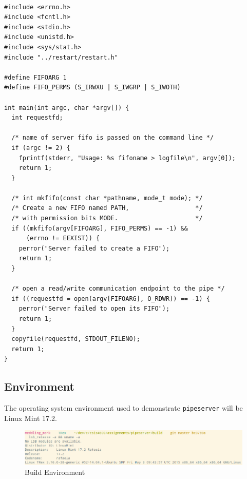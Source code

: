 \documentclass[letter,12pt,sffamily]{article}
\begin{document}
\begin{verbatim}

#include <errno.h>
#include <fcntl.h>
#include <stdio.h>
#include <unistd.h>
#include <sys/stat.h>
#include "../restart/restart.h"

#define FIFOARG 1
#define FIFO_PERMS (S_IRWXU | S_IWGRP | S_IWOTH)

int main(int argc, char *argv[]) {
  int requestfd;

  /* name of server fifo is passed on the command line */
  if (argc != 2) { 
    fprintf(stderr, "Usage: %s fifoname > logfile\n", argv[0]);
    return 1;
  }
	
  /* int mkfifo(const char *pathname, mode_t mode); */
  /* Create a new FIFO named PATH,                  */ 
  /* with permission bits MODE.                     */
  if ((mkfifo(argv[FIFOARG], FIFO_PERMS) == -1) && 
      (errno != EEXIST)) {
    perror("Server failed to create a FIFO");
    return 1;
  }
	
  /* open a read/write communication endpoint to the pipe */
  if ((requestfd = open(argv[FIFOARG], O_RDWR)) == -1) {
    perror("Server failed to open its FIFO");
    return 1;
  }
  copyfile(requestfd, STDOUT_FILENO);
  return 1;
}
\end{verbatim}
\subsection{Environment}
The operating system environment used to demonstrate \texttt{pipeserver} will be Linux Mint 17.2.
\begin{figure}[H]
	\centering
	\includegraphics[width=1\linewidth]{./images/0}
	\caption[env]{Build Environment}
	\label{fig:0}
\end{figure}
\end{document}
